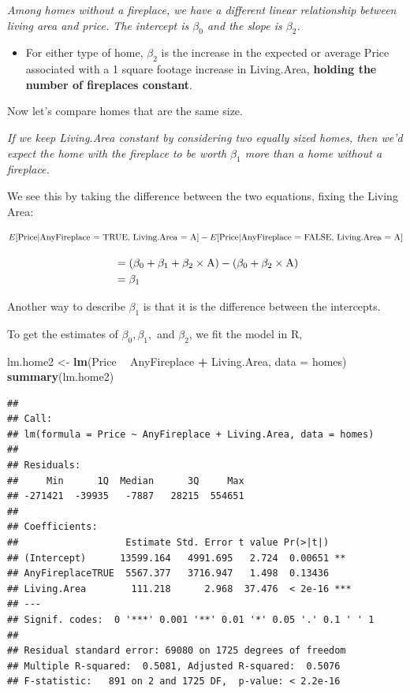 \documentclass[
]{book}
\newenvironment{Shaded}{\begin{snugshade}}{\end{snugshade}}
\newcommand{\DataTypeTok}[1]{\textcolor[rgb]{0.13,0.29,0.53}{#1}}
\newcommand{\KeywordTok}[1]{\textcolor[rgb]{0.13,0.29,0.53}{\textbf{#1}}}
\newcommand{\NormalTok}[1]{#1}
\newcommand{\OperatorTok}[1]{\textcolor[rgb]{0.81,0.36,0.00}{\textbf{#1}}}
\newcommand{\StringTok}[1]{\textcolor[rgb]{0.31,0.60,0.02}{#1}}
\providecommand{\tightlist}{%
  \setlength{\itemsep}{0pt}\setlength{\parskip}{0pt}}
\begin{document}
\emph{Among homes without a fireplace, we have a different linear relationship between living area and price. The intercept is \(\beta_0\) and the slope is \(\beta_2\).}

\begin{itemize}
\tightlist
\item
  For either type of home, \(\beta_2\) is the increase in the expected or average Price associated with a 1 square footage increase in Living.Area, \textbf{holding the number of fireplaces constant}.
\end{itemize}

Now let's compare homes that are the same size.

\emph{If we keep Living.Area constant by considering two equally sized homes, then we'd expect the home with the fireplace to be worth \(\beta_1\) more than a home without a fireplace.}

We see this by taking the difference between the two equations, fixing the Living Area:

\[E[\hbox{Price}| \hbox{AnyFireplace = TRUE, Living.Area = A}] - E[\hbox{Price}| \hbox{AnyFireplace = FALSE, Living.Area = A}]\]

\begin{align*}
\,&= (\beta_0+\beta_1 + \beta_2 \times \hbox{A}) - ( \beta_0 + \beta_2 \times \hbox{A})\\
\,&= \beta_1
\end{align*}

Another way to describe \(\beta_1\) is that it is the difference between the intercepts.

To get the estimates of \(\beta_0,\beta_1,\) and \(\beta_2\), we fit the model in R,

\begin{Shaded}
\begin{Highlighting}[]
\NormalTok{lm.home2 <-}\StringTok{ }\KeywordTok{lm}\NormalTok{(Price }\OperatorTok{~}\StringTok{ }\NormalTok{AnyFireplace }\OperatorTok{+}\StringTok{ }\NormalTok{Living.Area, }\DataTypeTok{data =}\NormalTok{ homes)}
\KeywordTok{summary}\NormalTok{(lm.home2)}
\end{Highlighting}
\end{Shaded}

\begin{verbatim}
## 
## Call:
## lm(formula = Price ~ AnyFireplace + Living.Area, data = homes)
## 
## Residuals:
##     Min      1Q  Median      3Q     Max 
## -271421  -39935   -7887   28215  554651 
## 
## Coefficients:
##                   Estimate Std. Error t value Pr(>|t|)    
## (Intercept)      13599.164   4991.695   2.724  0.00651 ** 
## AnyFireplaceTRUE  5567.377   3716.947   1.498  0.13436    
## Living.Area        111.218      2.968  37.476  < 2e-16 ***
## ---
## Signif. codes:  0 '***' 0.001 '**' 0.01 '*' 0.05 '.' 0.1 ' ' 1
## 
## Residual standard error: 69080 on 1725 degrees of freedom
## Multiple R-squared:  0.5081,	Adjusted R-squared:  0.5076 
## F-statistic:   891 on 2 and 1725 DF,  p-value: < 2.2e-16
\end{verbatim}
\end{document}
